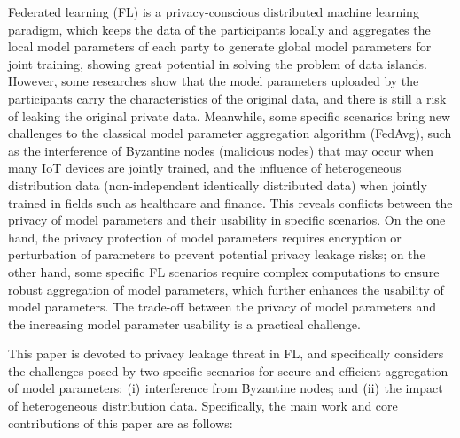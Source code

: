 \begin{eabstract}

Federated learning (FL) is a privacy-conscious distributed machine learning paradigm, which keeps the data of the participants locally and aggregates the local model parameters of each party to generate global model parameters for joint training, showing great potential in solving the problem of data islands. However, some researches show that the model parameters uploaded by the participants carry the characteristics of the original data, and there is still a risk of leaking the original private data. Meanwhile, some specific scenarios bring new challenges to the classical model parameter aggregation algorithm (FedAvg), such as the interference of Byzantine nodes (malicious nodes) that may occur when many IoT devices are jointly trained, and the influence of heterogeneous distribution data (non-independent identically distributed data) when jointly trained in fields such as healthcare and finance.
This reveals conflicts between the privacy of model parameters and their usability in specific scenarios. On the one hand, the privacy protection of model parameters requires encryption or perturbation of parameters to prevent potential privacy leakage risks; on the other hand, some specific FL scenarios require complex computations to ensure robust aggregation of model parameters, which further enhances the usability of model parameters. The trade-off between the privacy of model parameters and the increasing model parameter usability is a practical challenge.

This paper is devoted to privacy leakage threat in FL, and specifically considers the challenges posed by two specific scenarios for secure and efficient aggregation of model parameters: $(\rm \romannumeral1)$ interference from Byzantine nodes; and $(\rm \romannumeral2)$ the impact of heterogeneous distribution data. Specifically, the main work and core contributions of this paper are as follows:


\end{eabstract}
